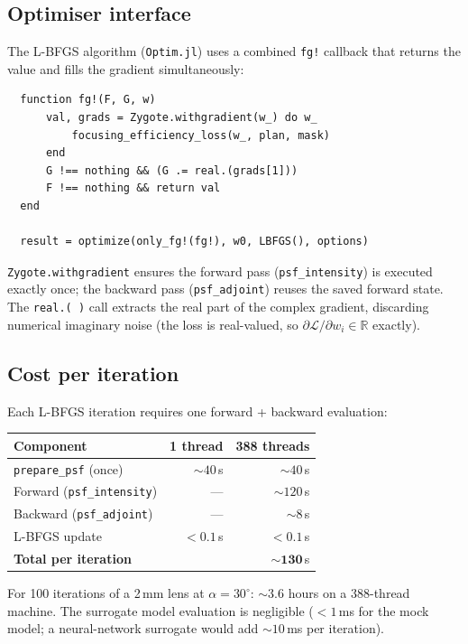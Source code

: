 \documentclass[11pt,a4paper]{article}
\begin{document}
\subsection{Optimiser interface}

The L-BFGS algorithm (\texttt{Optim.jl}) uses a combined \texttt{fg!} callback
that returns the value and fills the gradient simultaneously:
\begin{verbatim}
  function fg!(F, G, w)
      val, grads = Zygote.withgradient(w_) do w_
          focusing_efficiency_loss(w_, plan, mask)
      end
      G !== nothing && (G .= real.(grads[1]))
      F !== nothing && return val
  end

  result = optimize(only_fg!(fg!), w0, LBFGS(), options)
\end{verbatim}

\noindent
\texttt{Zygote.withgradient} ensures the forward pass (\texttt{psf\_intensity})
is executed exactly once; the backward pass (\texttt{psf\_adjoint}) reuses the
saved forward state.  The \texttt{real.(\,)} call extracts the real part of
the complex gradient, discarding numerical imaginary noise
(the loss is real-valued, so $\partial\mathcal{L}/\partial w_i \in \mathbb{R}$
exactly).

\subsection{Cost per iteration}

Each L-BFGS iteration requires one forward + backward evaluation:

\begin{center}
\begin{tabular}{@{}l r r@{}}
\toprule
\textbf{Component} & \textbf{1 thread} & \textbf{388 threads} \\
\midrule
\texttt{prepare\_psf} (once) & ${\sim}40$\,s & ${\sim}40$\,s \\
Forward (\texttt{psf\_intensity}) & --- & ${\sim}120$\,s \\
Backward (\texttt{psf\_adjoint}) & --- & ${\sim}8$\,s \\
L-BFGS update & $< 0.1$\,s & $< 0.1$\,s \\
\midrule
\textbf{Total per iteration} & & ${\sim}\mathbf{130}$\,s \\
\bottomrule
\end{tabular}
\end{center}

\noindent
For 100 iterations of a 2\,mm lens at $\alpha = 30^\circ$: ${\sim}3.6$ hours
on a 388-thread machine.  The surrogate model evaluation is negligible
($< 1$\,ms for the mock model; a neural-network surrogate would add
${\sim}10$\,ms per iteration).
\end{document}
